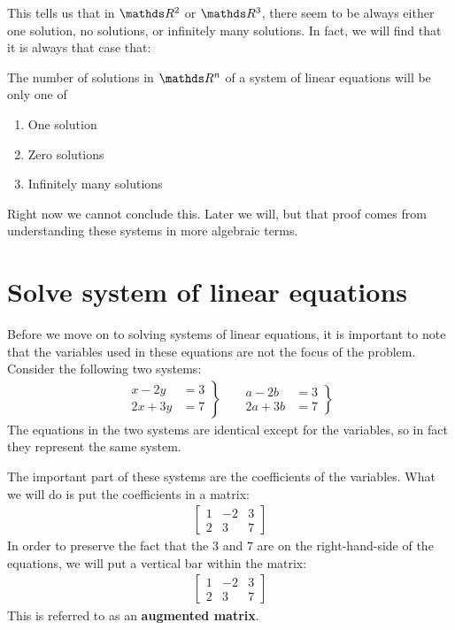 \documentclass[11pt]{article}
\newcommand{\keyphrase}{\textbf}
\begin{document}
This tells us that in $\bbR^2$ or $\bbR^3$, there seem to be always either one solution, no solutions, or infinitely many solutions. In fact, we will find that it is always that case that:


The number of solutions in $\bbR^n$ of a system of linear equations will be only one of
\begin{enumerate}
\item{
One solution
}
\item{
Zero solutions
}
\item{
Infinitely many solutions
}
\end{enumerate}

Right now we cannot conclude this. Later we will, but that proof comes from understanding these systems in more algebraic terms.

\newpage

\section*{Solve system of linear equations}

Before we move on to solving systems of linear equations, it is important to note that the variables used in these equations are not the focus of the problem. Consider the following two systems:
\begin{align*}
\left.
\begin{aligned}
x - 2y &= 3
\\
2x + 3y &= 7
\end{aligned}
\right\}
&&
\left.
\begin{aligned}
a - 2b &= 3
\\
2a + 3b &= 7
\end{aligned}
\right\}
\end{align*}
The equations in the two systems are identical except for the variables, so in fact they represent the same system.

The important part of these systems are the coefficients of the variables. What we will do is put the coefficients in a matrix:
\begin{align*}
\left[ \begin{matrix}
1 & -2 & 3
\\
2 & 3 & 7
\end{matrix} \right]
\end{align*}
In order to preserve the fact that the $3$ and $7$ are on the right-hand-side of the equations, we will put a vertical bar within the matrix:
\begin{align*}
\left[ \begin{matrix}
1 & -2 & 3
\\
2 & 3 & 7
\end{matrix} \right]
\end{align*}
This is referred to as an \keyphrase{augmented matrix}. 
\end{document}
